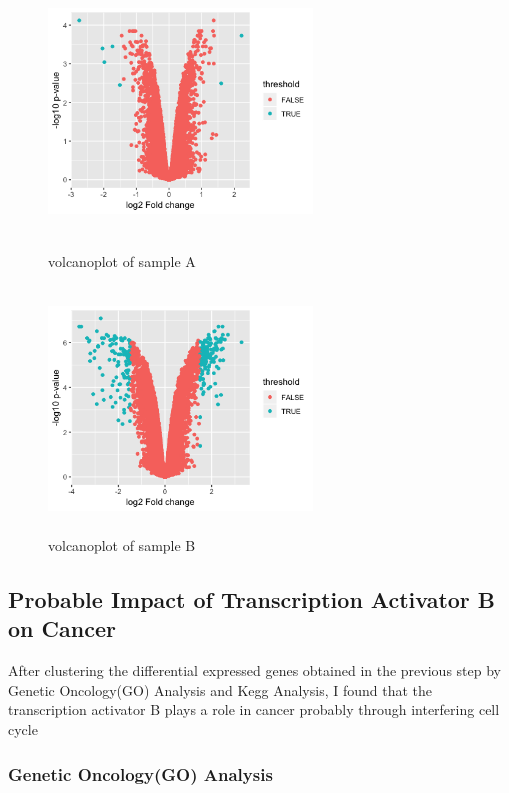 \documentclass[fleqn,10pt]{wlscirep}
\begin{document}
\begin{figure}[h]
    \begin{minipage}[t]{0.45\linewidth}
    \centering
    \includegraphics[width=7cm,height=6.5cm]{sA.png}
    \caption{volcanoplot of sample A}
    \end{minipage}
    \begin{minipage}[t]{0.45\linewidth}        %
    \hspace{2mm}
    \includegraphics[width=7cm,height=6.5cm]{sB.png}
    \caption{volcanoplot of sample B}
    \end{minipage}
\end{figure}

\subsection*{Probable Impact of Transcription Activator B on Cancer}
After clustering the differential expressed genes obtained in the previous step by Genetic Oncology(GO) Analysis and Kegg Analysis, I found that the transcription activator B plays a role in cancer probably through interfering cell cycle 

\subsubsection{Genetic Oncology(GO) Analysis}
\end{document}
